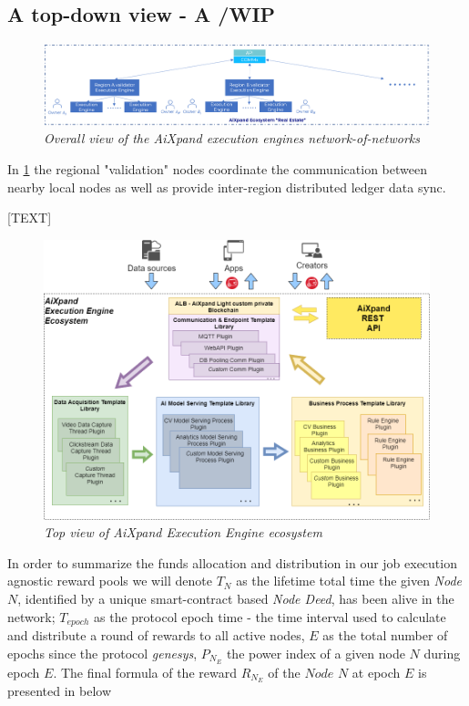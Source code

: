 \documentclass{article}
\begin{document}
\subsection{A top-down view - A /WIP}
\begin{figure}[htp]
    \centering
    \includegraphics[width=16cm]{aixp_overall.png}
    \caption{\textit{Overall view of the AiXpand execution engines network-of-networks}}
    \label{fig:aixp_overall}
\end{figure}


In \figurename{\ref{fig:aixp_overall}} the regional "validation" nodes coordinate the communication between nearby local nodes as well as provide inter-region distributed ledger data sync.

[TEXT]


\begin{figure}[h]
    \centering
    \includegraphics[width=16cm]{ee.png}
    \caption{\textit{Top view of AiXpand Execution Engine ecosystem}}
    \label{fig:ee}
\end{figure}


In order to summarize the funds allocation and distribution in our job execution agnostic reward pools we will denote $T_{N}$ as the lifetime total time the given \textit{Node} $N$, identified by a unique smart-contract based \textit{Node Deed}, has been alive in the network; $T_{epoch}$ as the protocol epoch time - the time interval used to calculate and distribute a round of rewards to all active nodes, $E$ as the total number of epochs since the protocol \textit{genesys}, $P_{N_E}$ the power index of a given node $N$ during epoch $E$. The final formula of the reward $R_{N_E}$ of the $Node$ $N$ at epoch $E$ is presented in below \equationautorefname{\ref{eqr:5}} 
\end{document}
